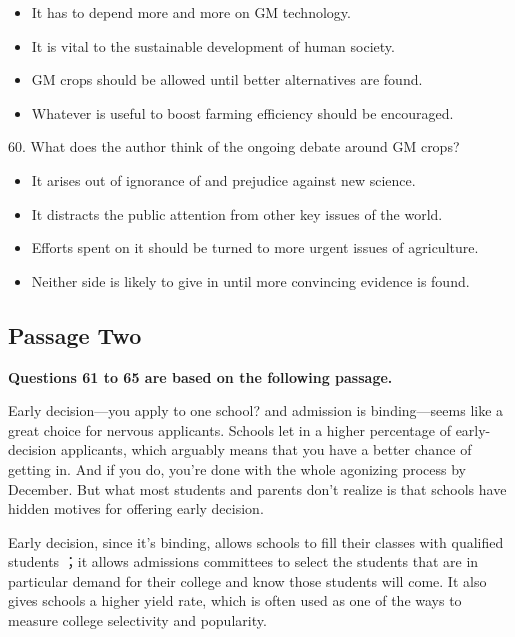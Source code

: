 \documentclass[UTF8,11pt]{ctexart}
\begin{document}
\begin{itemize}[leftmargin=2em,itemsep=.2em,topsep=.4em]\item[A.] It has to depend more and more on GM technology.
\item[B.] It is vital to the sustainable development of human society.
\item[C.] GM crops should be allowed until better alternatives are found.
\item[D.] Whatever is useful to boost farming efficiency should be encouraged.
\end{itemize}

60. What does the author think of the ongoing debate around GM crops?


\begin{itemize}[leftmargin=2em,itemsep=.2em,topsep=.4em]\item[A.] It arises out of ignorance of and prejudice against new science.
\item[B.] It distracts the public attention from other key issues of the world.
\item[C.] Efforts spent on it should be turned to more urgent issues of agriculture.
\item[D.] Neither side is likely to give in until more convincing evidence is found.
\end{itemize}

\subsection*{\textbf{Passage Two}}


\textbf{Questions 61 to 65 are based on the following passage.}


Early decision—you apply to one school? and admission is binding—seems like a great choice for nervous applicants. Schools let in a higher percentage of early-decision applicants, which arguably means that you have a better chance of getting in. And if you do, you’re done with the whole agonizing process by December. But what most students and parents don’t realize is that schools have hidden motives for offering early decision.


Early decision, since it’s binding, allows schools to fill their classes with qualified students ；it allows admissions committees to select the students that are in particular demand for their college and know those students will come. It also gives schools a higher yield rate, which is often used as one of the ways to measure college selectivity and popularity.
\end{document}
